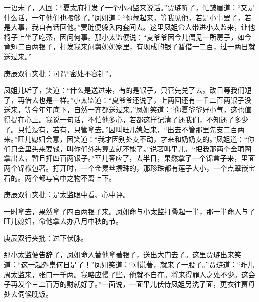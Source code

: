 

\begin{parag}
    一语未了，人回：“夏太府打发了一个小内监来说话。”贾琏听了，忙皱眉道：“又是什么话，一年他们也搬够了。”凤姐道：“你藏起来，等我见他，若是小事罢了，若是大事，我自有话回他。”贾琏便躲入内套间去。这里凤姐命人带进小太监来，让他椅子上坐了吃茶，因问何事。那小太监便说：“夏爷爷因今儿偶见一所房子，如今竟短二百两银子，打发我来问舅奶奶家里，有现成的银子暂借一二百，过一两日就送过来。”\begin{note}庚辰双行夹批：可谓“密处不容针”。\end{note}凤姐儿听了，笑道：“什么是送过来，有的是银子，只管先兑了去。改日等我们短了，再借去也是一样。”小太监道：“夏爷爷还说了，上两回还有一千二百两银子没送来，等今年年底下，自然一齐都送过来。”凤姐笑道：“你夏爷爷好小气，这也值得提在心上。我说一句话，不怕他多心，若都这样记清了还我们，不知还了多少了。只怕没有，若有，只管拿去。”因叫旺儿媳妇来，“出去不管那里先支二百两来。”旺儿媳妇会意，因笑道：“我才因别处支不动，才来和奶奶支的。”凤姐道：“你们只会里头来要钱，叫你们外头算去就不能了。”说著叫平儿，“把我那两个金项圈拿出去，暂且押四百两银子。”平儿答应了，去半日，果然拿了一个锦盒子来，里面两个锦袱包著。打开时，一个金累丝攒珠的，那珍珠都有莲子大小，一个点翠嵌宝石的。两个都与宫中之物不离上下。\begin{note}庚辰双行夹批：是太监眼中看、心中评。\end{note}一时拿去，果然拿了四百两银子来。凤姐命与小太监打叠起一半，那一半命人与了旺儿媳妇，命他拿去办八月中秋的节。\begin{note}庚辰双行夹批：过下伏脉。\end{note}那小太监便告辞了，凤姐命人替他拿著银子，送出大门去了。这里贾琏出来笑道：“这一起外祟何日是了！”凤姐笑道：“刚说著，就来了一股子。”贾琏道：“昨儿周太监来，张口一千两。我略应慢了些，他就不自在。将来得罪人之处不少。这会子再发个三二百万的财就好了。”一面说，一面平儿伏侍凤姐另洗了面，更衣往贾母处去伺候晚饭。
\end{parag}


